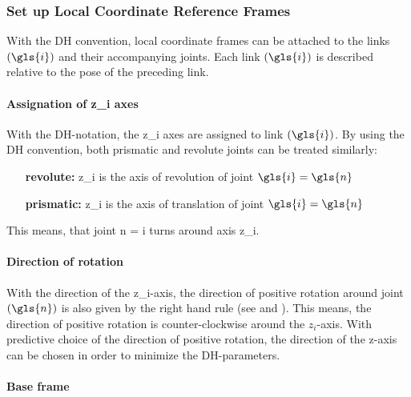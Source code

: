 \subsubsection{Set up Local Coordinate Reference Frames} \label{sec:localRefFrame}
With the \ac{DH} convention, local coordinate frames can be attached to the links $ (\gls{i}) $ and their accompanying joints. %
Each link $(\gls{i})$ is described relative to the pose of the preceding link.



\paragraph{Assignation of \gls{z_i} axes}\label{par:z_iAxesAssign}

With the \ac{DH}-notation, the \gls{z_i} axes are assigned to link $(\gls{i})$. 
By using the  \ac{DH} convention, both prismatic and revolute joints can be treated similarly: %
\begin{itemize}[wide=\parindent]
	\item[\textbf{revolute:}] \gls{z_i} is the axis of revolution of joint $\gls{i} = \gls{n}$ %
	\item[\textbf{prismatic:}] \gls{z_i} is the axis of translation of joint $\gls{i}= \gls{n}$ %
\end{itemize}
This means, that joint \gls{n} = \gls{i} turns around axis \gls{z_i}.

\paragraph{Direction of rotation}
With the direction of the \gls{z_i}-axis, the direction of positive rotation around joint $(\gls{n})$ is also given by the right hand rule (see \cite{RightHandRule} and \cite{Angela_U1S2P1}). This means, the direction of positive rotation is counter-clockwise around the $z_i$-axis.
With predictive choice of the direction of positive rotation, the direction of the z-axis can be chosen in order to minimize the DH-parameters. %



\paragraph{Base frame}

